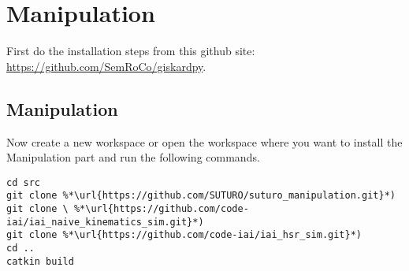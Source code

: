 \documentclass[main.tex]{subfiles}
\begin{document}
\section{Manipulation}
\label{sec:Manipulation}

First do the installation steps from this github site:\\
	\url{https://github.com/SemRoCo/giskardpy}.\\
	
	\subsection{Manipulation}
Now create a new workspace or open the workspace where you want to install the Manipulation part and run the following commands.	
\begin{lstlisting}
cd src
git clone %*\url{https://github.com/SUTURO/suturo_manipulation.git}*)
git clone \ %*\url{https://github.com/code-iai/iai_naive_kinematics_sim.git}*)
git clone %*\url{https://github.com/code-iai/iai_hsr_sim.git}*)
cd ..
catkin build  
\end{lstlisting}
	
	
\end{document}
